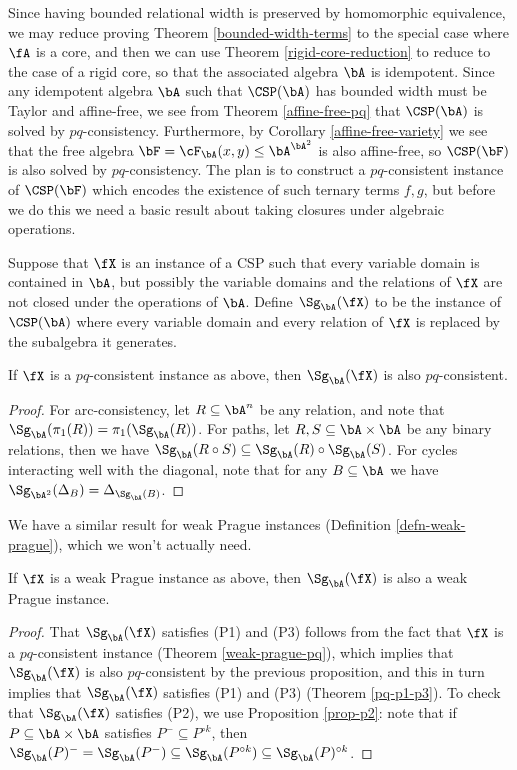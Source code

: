 Since having bounded relational width is preserved by homomorphic equivalence, we may reduce proving Theorem \ref{bounded-width-terms} to the special case where $\fA$ is a core, and then we can use Theorem \ref{rigid-core-reduction} to reduce to the case of a rigid core, so that the associated algebra $\bA$ is idempotent. Since any idempotent algebra $\bA$ such that $\CSP(\bA)$ has bounded width must be Taylor and affine-free, we see from Theorem \ref{affine-free-pq} that $\CSP(\bA)$ is solved by $pq$-consistency. Furthermore, by Corollary \ref{affine-free-variety} we see that the free algebra $\bF = \cF_{\bA}(x,y) \le \bA^{\bA^2}$ is also affine-free, so $\CSP(\bF)$ is also solved by $pq$-consistency. The plan is to construct a $pq$-consistent instance of $\CSP(\bF)$ which encodes the existence of such ternary terms $f,g$, but before we do this we need a basic result about taking closures under algebraic operations.

\begin{defn} Suppose that $\fX$ is an instance of a CSP such that every variable domain is contained in $\bA$, but possibly the variable domains and the relations of $\fX$ are not closed under the operations of $\bA$. Define $\Sg_\bA(\fX)$ to be the instance of $\CSP(\bA)$ where every variable domain and every relation of $\fX$ is replaced by the subalgebra it generates.
\end{defn}

\begin{prop}\label{pq-algebraic-closure} If $\fX$ is a $pq$-consistent instance as above, then $\Sg_\bA(\fX)$ is also $pq$-consistent.
\end{prop}
\begin{proof} For arc-consistency, let $R \subseteq \bA^n$ be any relation, and note that $\Sg_\bA(\pi_1(R)) = \pi_1(\Sg_\bA(R))$. For paths, let $R,S \subseteq \bA\times \bA$ be any binary relations, then we have $\Sg_\bA(R\circ S) \subseteq \Sg_\bA(R)\circ \Sg_\bA(S)$. For cycles interacting well with the diagonal, note that for any $B \subseteq \bA$ we have $\Sg_{\bA^2}(\Delta_B) = \Delta_{\Sg_\bA(B)}$.
\end{proof}

We have a similar result for weak Prague instances (Definition \ref{defn-weak-prague}), which we won't actually need.

\begin{prop} If $\fX$ is a weak Prague instance as above, then $\Sg_\bA(\fX)$ is also a weak Prague instance.
\end{prop}
\begin{proof} That $\Sg_\bA(\fX)$ satisfies (P1) and (P3) follows from the fact that $\fX$ is a $pq$-consistent instance (Theorem \ref{weak-prague-pq}), which implies that $\Sg_\bA(\fX)$ is also $pq$-consistent by the previous proposition, and this in turn implies that $\Sg_\bA(\fX)$ satisfies (P1) and (P3) (Theorem \ref{pq-p1-p3}). To check that $\Sg_\bA(\fX)$ satisfies (P2), we use Proposition \ref{prop-p2}: note that if $P \subseteq \bA\times \bA$ satisfies $P^- \subseteq P^{\circ k}$, then $\Sg_\bA(P)^- = \Sg_\bA(P^-) \subseteq \Sg_\bA(P^{\circ k}) \subseteq \Sg_\bA(P)^{\circ k}$.
\end{proof}

